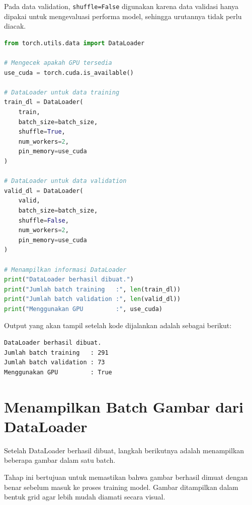 Pada data validation, \texttt{shuffle=False} digunakan karena data validasi hanya dipakai untuk mengevaluasi performa model, sehingga urutannya tidak perlu diacak.

\begin{lstlisting}[language=Python, caption=Membuat DataLoader]
from torch.utils.data import DataLoader

# Mengecek apakah GPU tersedia
use_cuda = torch.cuda.is_available()

# DataLoader untuk data training
train_dl = DataLoader(
    train,
    batch_size=batch_size,
    shuffle=True,
    num_workers=2,
    pin_memory=use_cuda
)

# DataLoader untuk data validation
valid_dl = DataLoader(
    valid,
    batch_size=batch_size,
    shuffle=False,
    num_workers=2,
    pin_memory=use_cuda
)

# Menampilkan informasi DataLoader
print("DataLoader berhasil dibuat.")
print("Jumlah batch training   :", len(train_dl))
print("Jumlah batch validation :", len(valid_dl))
print("Menggunakan GPU         :", use_cuda)
\end{lstlisting}

Output yang akan tampil setelah kode dijalankan adalah sebagai berikut:

\begin{outputcode}[H]
\begin{lstlisting}[language={}]
DataLoader berhasil dibuat.
Jumlah batch training   : 291
Jumlah batch validation : 73
Menggunakan GPU         : True
\end{lstlisting}
\caption{Output pembuatan DataLoader}
\end{outputcode}

\section{Menampilkan Batch Gambar dari DataLoader}

Setelah DataLoader berhasil dibuat, langkah berikutnya adalah menampilkan beberapa gambar dalam satu batch.

Tahap ini bertujuan untuk memastikan bahwa gambar berhasil dimuat dengan benar sebelum masuk ke proses training model. Gambar ditampilkan dalam bentuk grid agar lebih mudah diamati secara visual.

